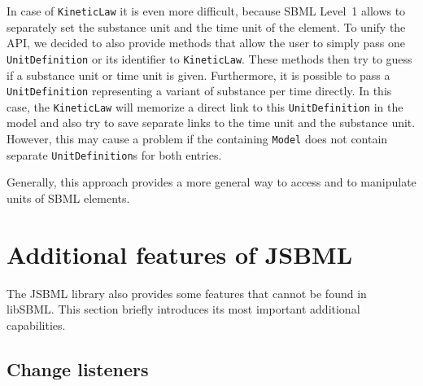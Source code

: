 In case of \texttt{KineticLaw}
%
it is even more difficult, because
SBML Level~1 allows to separately set the substance unit and the time unit of
the element. To unify the API, we decided to also provide methods that allow
the user to simply pass one \texttt{UnitDefinition}
%
or its identifier to
\texttt{KineticLaw}.
%
These methods then try to guess if a substance unit or time
unit is given. Furthermore, it is possible to pass a \texttt{UnitDefinition}
representing a variant of substance per time directly. In this case, the
\texttt{KineticLaw}
%
will memorize a direct link to this \texttt{UnitDefinition}
in the model and also try to save separate links to the time unit and the
substance unit. However, this may cause a problem if the containing
\texttt{Model} does not contain separate \texttt{UnitDefinition}s for both
entries.

Generally, this approach provides a more general way to access and to manipulate
units of SBML elements.

\section{Additional features of JSBML}

The JSBML library also provides some features that cannot be found in libSBML.
This section briefly introduces its most important additional capabilities.

\subsection{Change listeners}

